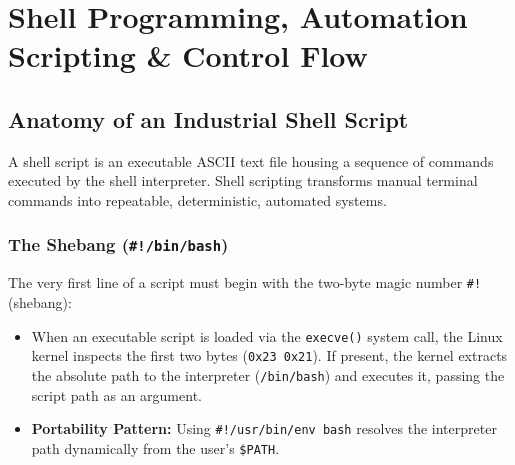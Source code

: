 \chapter{Shell Programming, Automation Scripting \& Control Flow}
\label{chap:shell-programming}

\section{Anatomy of an Industrial Shell Script}
A shell script is an executable ASCII text file housing a sequence of commands executed by the shell interpreter. Shell scripting transforms manual terminal commands into repeatable, deterministic, automated systems.

\subsection{The Shebang (\texttt{\#!/bin/bash})}
The very first line of a script must begin with the two-byte magic number \texttt{\#!} (shebang):
\begin{itemize}[leftmargin=1.5em]
    \item When an executable script is loaded via the \texttt{execve()} system call, the Linux kernel inspects the first two bytes (\texttt{0x23 0x21}). If present, the kernel extracts the absolute path to the interpreter (\texttt{/bin/bash}) and executes it, passing the script path as an argument.
    \item \textbf{Portability Pattern:} Using \texttt{\#!/usr/bin/env bash} resolves the interpreter path dynamically from the user's \texttt{\$PATH}.
\end{itemize}

